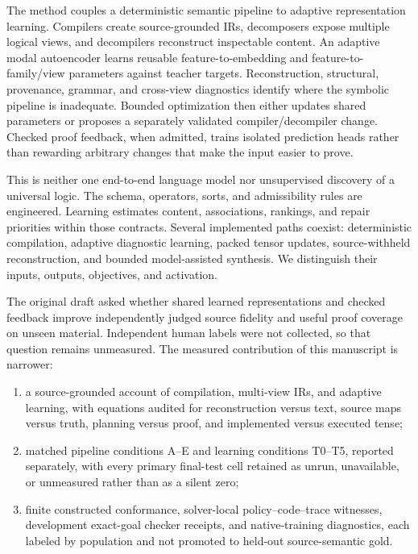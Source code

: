 \documentclass{article}
\begin{document}
The method couples a deterministic semantic pipeline to adaptive representation learning. Compilers create source-grounded IRs, decomposers expose multiple logical views, and decompilers reconstruct inspectable content. An adaptive modal autoencoder learns reusable feature-to-embedding and feature-to-family/view parameters against teacher targets. Reconstruction, structural, provenance, grammar, and cross-view diagnostics identify where the symbolic pipeline is inadequate. Bounded optimization then either updates shared parameters or proposes a separately validated compiler/decompiler change. Checked proof feedback, when admitted, trains isolated prediction heads rather than rewarding arbitrary changes that make the input easier to prove.

This is neither one end-to-end language model nor unsupervised discovery of a universal logic. The schema, operators, sorts, and admissibility rules are engineered. Learning estimates content, associations, rankings, and repair priorities within those contracts. Several implemented paths coexist: deterministic compilation, adaptive diagnostic learning, packed tensor updates, source-withheld reconstruction, and bounded model-assisted synthesis. We distinguish their inputs, outputs, objectives, and activation.

The original draft asked whether shared learned representations and checked feedback improve independently judged source fidelity and useful proof coverage on unseen material. Independent human labels were not collected, so that question remains unmeasured. The measured contribution of this manuscript is narrower:

\begin{enumerate}
\item a source-grounded account of compilation, multi-view IRs, and adaptive learning, with equations audited for reconstruction versus text, source maps versus truth, planning versus proof, and implemented versus executed tense;
\item matched pipeline conditions A--E and learning conditions T0--T5, reported separately, with every primary final-test cell retained as unrun, unavailable, or unmeasured rather than as a silent zero;
\item finite constructed conformance, solver-local policy--code--trace witnesses, development exact-goal checker receipts, and native-training diagnostics, each labeled by population and not promoted to held-out source-semantic gold.
\end{enumerate}
\end{document}
